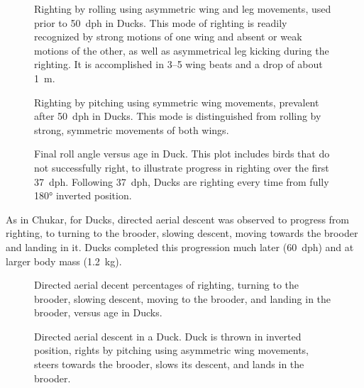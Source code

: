 \documentclass[10pt]{article}
\begin{document}
\begin{figure}
\begin{center}
\end{center}
\caption{Righting by rolling using asymmetric wing and leg movements, used prior to \SI{50}{dph} in Ducks. This mode of righting is readily recognized by strong motions of one wing and absent or weak motions of the other, as well as asymmetrical leg kicking during the righting.  It is accomplished in \numrange{3}{5} wing beats and a drop of about \SI{1}{\meter}.}
\label{fig:duckrolling}
\end{figure}
\begin{figure}
\begin{center}
\end{center}
\caption{Righting by pitching using symmetric wing movements, prevalent after \SI{50}{dph} in Ducks.  This mode is distinguished from rolling by strong, symmetric movements of both wings.}
\label{fig:duckpitching}
\end{figure}
\begin{figure}
\begin{center}
\end{center}
\caption{Final roll angle versus age in Duck.  This plot includes birds that do not successfully right, to illustrate progress in righting over the first \SI{37}{dph}.  Following \SI{37}{dph}, Ducks are righting every time from fully \ang{180} inverted position.}
\label{fig:duckrighting4}
\end{figure}
	As in Chukar, for Ducks, directed aerial descent was observed to progress from righting, to turning to the brooder, slowing descent, moving towards the brooder and landing in it.  Ducks completed this progression much later (\SI{60}{dph}) and at larger body mass (\SI{1.2}{\kilo\gram}). 
\begin{figure}
\begin{center}
\end{center}
\caption{Directed aerial decent percentages of righting, turning to the brooder, slowing descent, moving to the brooder, and landing in the brooder, versus age in Ducks.}
\label{fig:duckddstages}
\end{figure}
\begin{figure}
\begin{center}
\end{center}
\caption{Directed aerial descent in a Duck. Duck is thrown in inverted position, rights by pitching using asymmetric wing movements, steers towards the brooder, slows its descent, and lands in the brooder.}
\label{fig:duckddpretty}
\end{figure}
\end{document}
